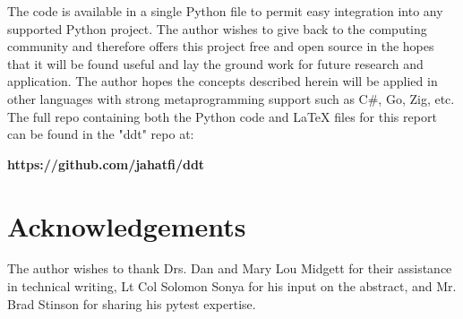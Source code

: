 \documentclass[10pt, conference]{IEEEtran}
\begin{document}
The code is available in a single Python file to permit 
easy integration into any supported Python project.
The author wishes to give back to the computing community
and therefore offers this project free and open source
in the hopes that it will be found useful and lay the ground
work for future research and application.
The author hopes the concepts described herein will be 
applied in other languages with strong metaprogramming support
such as C\#, Go, Zig, etc. The full repo containing both the Python code and
LaTeX files for this report can be found in the "ddt" repo at:
\begin{center}
  \textbf{https://github.com/jahatfi/ddt}
\end{center}


 \section{Acknowledgements}\label{sec:acknowledgements}

The author wishes to thank Drs. Dan and Mary Lou Midgett
for their assistance in technical writing, Lt Col Solomon Sonya
for his input on the abstract, and Mr. Brad Stinson for sharing his pytest
expertise.



 \newpage



\end{document}
